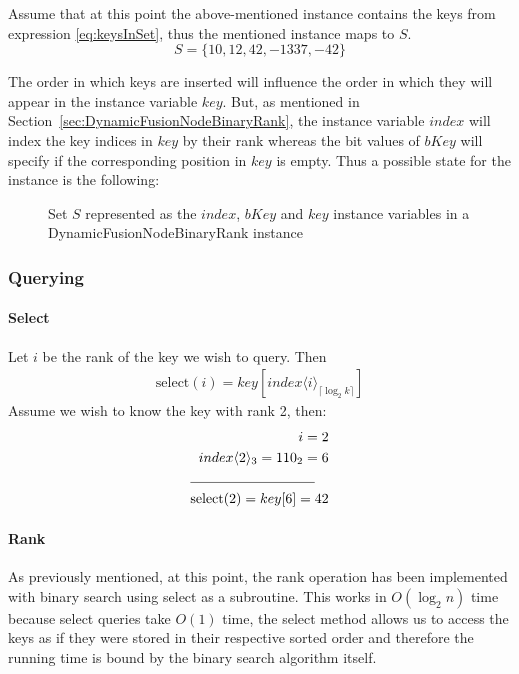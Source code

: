 Assume that at this point the above-mentioned instance contains the keys from expression \ref{eq:keysInSet}, thus the mentioned instance maps to $S$.
\begin{equation} \label{eq:keysInSet}
    S = \{10, 12, 42, -1337, -42 \}
\end{equation}

The order in which keys are inserted will influence the order in which they will appear in the instance variable $key$. But, as mentioned in Section~\ref{sec:DynamicFusionNodeBinaryRank}, the instance variable $index$ will index the key indices in $key$ by their rank whereas the bit values of $bKey$ will specify if the corresponding position in $key$ is empty. Thus a possible state for the instance is the following:

\begin{figure}[H]
\centering

\caption{Set $S$ represented as the $index$, $bKey$ and $key$ instance variables in a {\ttfamily DynamicFusionNodeBinaryRank} instance}
\label{fig:stateOfTheInstance}
\end{figure}

\subsubsection{Querying}

\paragraph{Select}
Let $i$ be the rank of the key we wish to query. Then
\begin{align*}
\text{select}(i) = key[ index\langle i\rangle_{\lceil \log_2 k \rceil}]
\end{align*}
Assume we wish to know the key with rank 2, then:
\begin{align*}
    i = 2 \\
    index\langle 2\rangle_3 = 110_2 = 6 \\
    \cline{1-2}
    \text{select}(2) = key[6] = 42
\end{align*}

\paragraph{Rank}
As previously mentioned, at this point, the rank operation has been implemented with binary search using select as a subroutine. This works in $O(\log_2 n)$ time because select queries take $O(1)$ time, the select method allows us to access the keys as if they were stored in their respective sorted order and therefore the running time is bound by the binary search algorithm itself.

